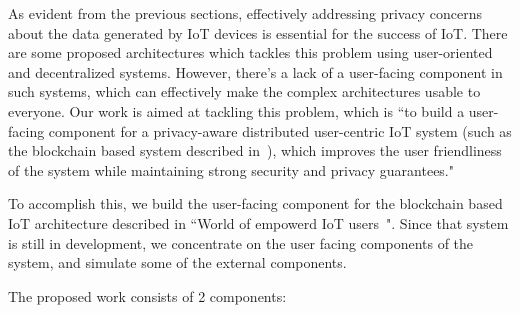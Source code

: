 As evident from the previous sections, effectively addressing privacy concerns about the data generated by IoT devices is essential for the success of IoT. There are some proposed architectures which tackles this problem using user-oriented and decentralized systems. However, there's a lack of a user-facing component in such systems, which can effectively make the complex architectures usable to everyone. Our work is aimed at tackling this problem, which is ``to build a user-facing component for a privacy-aware distributed user-centric IoT system (such as the blockchain based system described in~\cite{campbell}), which improves the user friendliness of the system while maintaining strong security and privacy guarantees."

To accomplish this, we build the user-facing component for the blockchain based IoT architecture described in ``World of empowerd IoT users~\cite{campbell}". Since that system is still in development, we concentrate on the user facing components of the system, and simulate some of the external components.

The proposed work consists of 2 components:


